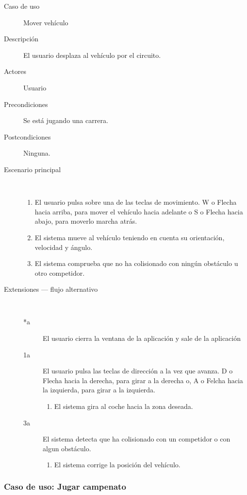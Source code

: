 \begin{description}
    \item[Caso de uso] Mover vehículo
    \item[Descripción] El usuario desplaza al vehículo por el circuito.
    \item[Actores] Usuario
    \item[Precondiciones] Se está jugando una carrera.
    \item[Postcondiciones] Ninguna.
    \item[Escenario principal] $\quad$
        \begin{enumerate}
            \item El usuario pulsa sobre una de las teclas de movimiento. W o Flecha hacia arriba, para mover el vehículo
            hacia adelante o S o Flecha hacia abajo, para moverlo marcha atrás.
            \item El sistema mueve al vehículo teniendo en cuenta su orientación, velocidad y ángulo.
            \item El sistema comprueba que no ha colisionado con ningún obstáculo u otro competidor.
        \end{enumerate}
    \item[Extensiones --- flujo alternativo] $\quad$
        \begin{description}
            \item[*a ] El usuario cierra la ventana de la aplicación y sale de la aplicación
            \item[1a ] El usuario pulsa las teclas de dirección a la vez que avanza. D o Flecha hacia la derecha, para girar
            a la derecha o, A o Felcha hacia la izquierda, para girar a la izquierda.
                \begin{enumerate}
                    \item El sistema gira al coche hacia la zona deseada.
                \end{enumerate}
            \item[3a ] El sistema detecta que ha colisionado con un competidor o con algun obstáculo.
                \begin{enumerate}
                    \item El sistema corrige la posición del vehículo.
                \end{enumerate}
        \end{description}
\end{description}

\subsubsection{Caso de uso: Jugar campenato}

